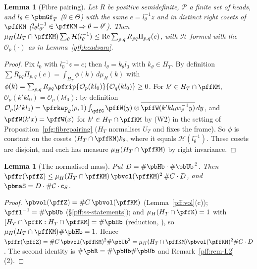 \documentclass[10pt]{amsart}
\newtheorem{lemma}[theorem]{Lemma}
\theoremstyle{definition}
\theoremstyle{remark}
\newcommand{\Rel}{\operatorname{Re}}
\begin{document}
\begin{lemma}[Fibre pairing]\label{pff:fibresum}
Let $R$ be positive semidefinite, $\mathcal P$ a finite set of heads, and $l_\theta\in\pbmGf_T$ ($\theta\in\Theta$) with
the same $e=l_\theta^{-1}z$ and in distinct right cosets of $\pffKM$ ($l_\theta l_{\theta'}^{-1}\in\pffKM\Rightarrow
\theta=\theta'$). Then $\mu_H(H_T\cap\pffKM)\sum_\theta\mathcal H(l_\theta^{-1})^{\vphantom{1}}\le\Rel\sum_{p,q}
R_{pq}\Pi_{p,q}(e)$, with $\mathcal H$ formed with the $\mathcal O_p(\cdot)$ as in Lemma~\ref{pff:headsum}.
\end{lemma}
\begin{proof}
Fix $l_0$ with $l_0^{-1}z=e$; then $l_\theta=k_\theta l_0$ with $k_\theta\in H_T$. By definition
$\sum R_{pq}\Pi_{p,q}(e)=\int_{H_T}\phi(k)\,d\mu_H(k)$ with $\phi(k)=\sum_{p,q}R_{pq}\pfrip{\mathcal O_p(kl_0)}
{\mathcal O_q(kl_0)}\ge0$. For $k'\in H_T\cap\pffKM$, $\mathcal O_p(k'kl_0)=\mathcal O_p(kl_0)$: by
definition $\mathcal O_p(k'kl_0)=\pfrkap_\varrho(p,1)\int_{\pffG}\pffW(y)\otimes\overline{\pffW(k'kl_0w_p^{-1}y)}\,dy$, and
$\pffW(k'x)=\pffW(x)$ for $k'\in H_T\cap\pffKM$ by \textup{(W2)} in the setting of Proposition~\ref{pfg:fibrepairing}
($H_T$ normalises $U_T$ and fixes the frame). So $\phi$ is constant on the cosets
$(H_T\cap\pffKM)k_\theta$, where it equals $\mathcal H(l_\theta^{-1})$. These cosets are disjoint, and each has
measure $\mu_H(H_T\cap\pffKM)$ by right invariance.
\end{proof}

\begin{lemma}[The normalised mass]\label{pff:rhoD}
Put $D=\#\pbHb\cdot\#\pbUb^{\,2}$. Then $\pffr(\pffZ)\le\mu_H(H_T\cap\pffKM)\,\pbvol(\pffKM)^2\,\#C\cdot D$, and
$\pbmaS=D\cdot\#\mathcal C\cdot\mathsf c_S$.
\end{lemma}
\begin{proof}
$\pbvol(\pffZ)=\#C\,\pbvol(\pffKM)$ (Lemma~\ref{pff:vol}(c)); $\pffl^{-1}=\#\pbUb$ (\S\ref{pff:ss-statements}); and
$\mu_H(H_T\cap\pffK)=1$ with $[H_T\cap\pffK:H_T\cap\pffKM]=\#\pbHb$ (reduction, {\cite[Lemma~2.1]{P51}}), so
$\mu_H(H_T\cap\pffKM)\#\pbHb=1$. Hence $\pffr(\pffZ)=\#C\,\pbvol(\pffKM)^2\#\pbUb^2=\mu_H(H_T\cap\pffKM)\pbvol(\pffKM)^2\#C
\cdot D$. The second identity is $\#\pbR=\#\pbHb\#\pbUb$ and Remark~\ref{pff:rem-L2}(2).
\end{proof}
\end{document}
